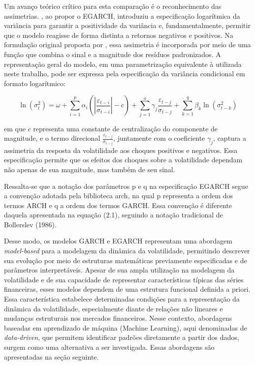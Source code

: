     Um avanço teórico crítico para esta comparação é o reconhecimento das assimetrias. \textcite{nelson1991conditional}, ao propor o EGARCH, introduziu a especificação logarítmica da variância para garantir a positividade da variância e, fundamentalmente, permitir que o 
modelo reagisse de forma distinta a retornos negativos e positivos. Na formulação original proposta por \textcite{nelson1991conditional}, essa assimetria é incorporada por meio de uma função que combina o sinal e a magnitude dos resíduos padronizados. A representação geral do modelo, 
em uma parametrização equivalente à utilizada neste trabalho, pode ser expressa pela especificação da variância condicional em formato logarítmico:

\begin{equation}
\ln(\sigma_t^2) = \omega
+ \sum_{i=1}^{p} \alpha_i \left( \left| \frac{\varepsilon_{t-i}}{\sigma_{t-i}} \right| - c \right)
+ \sum_{j=1}^{o} \gamma_j \frac{\varepsilon_{t-j}}{\sigma_{t-j}}
+ \sum_{k=1}^{q} \beta_k \ln(\sigma_{t-k}^2)
\end{equation}

em que $c$ representa uma constante de centralização do componente de magnitude, e o termo direcional $\frac{\varepsilon_{t-j}}{\sigma_{t-j}}$, juntamente com o coeficiente $\gamma_j$, captura a assimetria da resposta da volatilidade aos choques positivos e negativos. Essa 
especificação permite que os efeitos dos choques sobre a volatilidade dependam não apenas de sua magnitude, mas também de seu sinal.

Ressalta-se que a notação dos parâmetros p e q na especificação EGARCH segue a convenção adotada pela biblioteca arch, na qual p representa a ordem dos termos ARCH e q a ordem dos termos GARCH. Essa convenção é diferente daquela apresentada na equação (2.1), seguindo a notação tradicional de Bollerslev (1986).

Desse modo, os modelos GARCH e EGARCH representam uma abordagem \textit{model-based} para a modelagem da dinâmica da volatilidade, permitindo descrever sua evolução por meio de estruturas matemáticas previamente especificadas e de parâmetros interpretáveis. Apesar de sua ampla utilização 
na modelagem da volatilidade e de sua capacidade de representar características típicas das séries financeiras, esses modelos dependem de uma estrutura funcional definida a priori. Essa característica estabelece determinadas condições para a representação da dinâmica da volatilidade, 
especialmente diante de relações não lineares e mudanças estruturais nos mercados financeiros. Nesse contexto, abordagens baseadas em aprendizado de máquina (Machine Learning), aqui denominadas de \textit{data-driven}, que permitem identificar padrões diretamente a partir dos dados, surgem como uma alternativa a ser investigada. 
Essas abordagens são apresentadas na seção seguinte.

